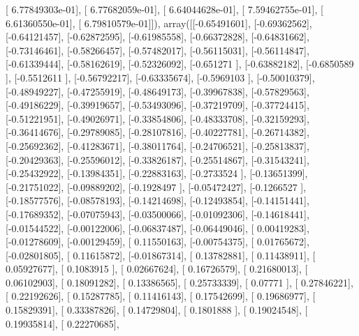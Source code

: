 \documentclass{article}
\begin{document}
       [  6.77849303e-01],
       [  6.77682059e-01],
       [  6.64044628e-01],
       [  7.59462755e-01],
       [  6.61360550e-01],
       [  6.79810579e-01]]), array([[-0.65491601],
       [-0.69362562],
       [-0.64121457],
       [-0.62872595],
       [-0.61985558],
       [-0.66372828],
       [-0.64831662],
       [-0.73146461],
       [-0.58266457],
       [-0.57482017],
       [-0.56115031],
       [-0.56114847],
       [-0.61339444],
       [-0.58162619],
       [-0.52326092],
       [-0.651271  ],
       [-0.63882182],
       [-0.6850589 ],
       [-0.5512611 ],
       [-0.56792217],
       [-0.63335674],
       [-0.5969103 ],
       [-0.50010379],
       [-0.48949227],
       [-0.47255919],
       [-0.48649173],
       [-0.39967838],
       [-0.57829563],
       [-0.49186229],
       [-0.39919657],
       [-0.53493096],
       [-0.37219709],
       [-0.37724415],
       [-0.51221951],
       [-0.49026971],
       [-0.33854806],
       [-0.48333708],
       [-0.32159293],
       [-0.36414676],
       [-0.29789085],
       [-0.28107816],
       [-0.40227781],
       [-0.26714382],
       [-0.25692362],
       [-0.41283671],
       [-0.38011764],
       [-0.24706521],
       [-0.25813837],
       [-0.20429363],
       [-0.25596012],
       [-0.33826187],
       [-0.25514867],
       [-0.31543241],
       [-0.25432922],
       [-0.13984351],
       [-0.22883163],
       [-0.2733524 ],
       [-0.13651399],
       [-0.21751022],
       [-0.09889202],
       [-0.1928497 ],
       [-0.05472427],
       [-0.1266527 ],
       [-0.18577576],
       [-0.08578193],
       [-0.14214698],
       [-0.12493854],
       [-0.14151441],
       [-0.17689352],
       [-0.07075943],
       [-0.03500066],
       [-0.01092306],
       [-0.14618441],
       [-0.01544522],
       [-0.00122006],
       [-0.06837487],
       [-0.06449046],
       [ 0.00419283],
       [-0.01278609],
       [-0.00129459],
       [ 0.11550163],
       [-0.00754375],
       [ 0.01765672],
       [-0.02801805],
       [ 0.11615872],
       [-0.01867314],
       [ 0.13782881],
       [ 0.11438911],
       [ 0.05927677],
       [ 0.1083915 ],
       [ 0.02667624],
       [ 0.16726579],
       [ 0.21680013],
       [ 0.06102903],
       [ 0.18091282],
       [ 0.13386565],
       [ 0.25733339],
       [ 0.07771   ],
       [ 0.27846221],
       [ 0.22192626],
       [ 0.15287785],
       [ 0.11416143],
       [ 0.17542699],
       [ 0.19686977],
       [ 0.15829391],
       [ 0.33387826],
       [ 0.14729804],
       [ 0.1801888 ],
       [ 0.19024548],
       [ 0.19935814],
       [ 0.22270685],
\end{document}
